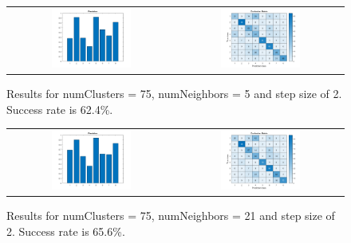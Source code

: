 \begin{figure}[h]
	\centering
	\begin{tabular}{cc}	
	\includegraphics[width=0.5\textwidth]{figures/precision_75C_5NN_2S.png} &
	\includegraphics[width=0.5\textwidth]{figures/confusion_75C_5NN_2S.png}

	\end{tabular}
	\caption{Results for numClusters = 75, numNeighbors = 5 and step size of 2. Success rate is 62.4\%.}
	\label{fig:a5:75c5nn2s}
\end{figure}

\begin{figure}[h]
	\centering
	\begin{tabular}{cc}	
	\includegraphics[width=0.5\textwidth]{figures/precision_75C_21NN_2S.png} &
	\includegraphics[width=0.5\textwidth]{figures/confusion_75C_21NN_2S.png}

	\end{tabular}
	\caption{Results for numClusters = 75, numNeighbors = 21 and step size of 2. Success rate is 65.6\%.}
	\label{fig:a5:75c21nn2s}
\end{figure}

